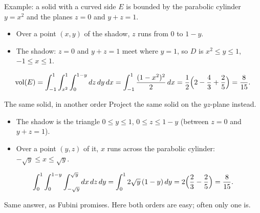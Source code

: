 \documentclass[10pt]{wosm-slides}
\begin{document}
\begin{frame}{Example: a solid with a curved side}
  $E$ is bounded by the parabolic cylinder $y = x^2$ and the planes $z = 0$ and $y + z = 1$.
  \pause
  \begin{itemize}
    \item Over a point $(x, y)$ of the shadow, $z$ runs from $0$ to $1 - y$.
    \item The shadow: $z = 0$ and $y + z = 1$ meet where $y = 1$, so $D$ is $x^2 \le y \le 1$,
      $-1 \le x \le 1$.
  \end{itemize}
  \pause
  \[ \operatorname{vol}(E) = \int_{-1}^1 \int_{x^2}^1 \int_0^{1-y} dz\, dy\, dx
     = \int_{-1}^1 \frac{(1 - x^2)^2}{2}\, dx = \frac12\Bigl(2 - \frac43 + \frac25\Bigr) = \frac{8}{15} . \]
\end{frame}

\begin{frame}{The same solid, in another order}
  Project the same solid on the $yz$-plane instead.
  \pause
  \begin{itemize}
    \item The shadow is the triangle $0 \le y \le 1$, $0 \le z \le 1 - y$ (between $z = 0$ and $y + z = 1$).
    \item Over a point $(y, z)$ of it, $x$ runs across the parabolic cylinder: $-\sqrt y \le x \le \sqrt y$.
  \end{itemize}
  \pause
  \[ \int_0^1 \int_0^{1-y} \int_{-\sqrt y}^{\sqrt y} dx\, dz\, dy = \int_0^1 2\sqrt y\, (1 - y)\, dy
     = 2\Bigl(\frac23 - \frac25\Bigr) = \frac{8}{15} . \]
  \pause
  {\small Same answer, as Fubini promises. Here both orders are easy; often only one is.\par}
\end{frame}
\end{document}
